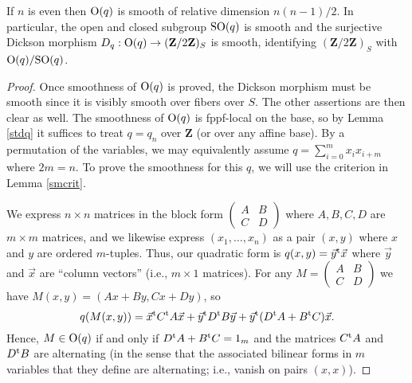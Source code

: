 \documentclass[10pt]{article}
\renewcommand{\(}{\left(}
\renewcommand{\)}{\right)}
\numberwithin{thm}{subsection}
\begin{document}
\begin{prop}\label{evensmooth} If $n$ is even then ${\rm{O}}(q)$ is smooth
of relative dimension $n(n-1)/2$.
In particular, the open and closed subgroup ${\rm{SO}}(q)$ is smooth and 
the surjective Dickson morphism $D_q:{\rm{O}}(q) \rightarrow ({\mathbf{Z}}/2{\mathbf{Z}})_S$
is smooth, identifying $({\mathbf{Z}}/2{\mathbf{Z}})_S$ with ${\rm{O}}(q)/{\rm{SO}}(q)$. 
\end{prop}

\begin{proof}
Once smoothness of ${\rm{O}}(q)$ is proved, the Dickson morphism
must be smooth since it is visibly smooth over fibers over $S$.
The other assertions are then clear as well.
The smoothness of ${\rm{O}}(q)$ is fppf-local on the base,
so by Lemma \ref{stdq} it suffices to treat $q = q_n$ over ${\mathbf{Z}}$ (or over any affine base).
By a permutation of the variables, we may equivalently assume
$q = \sum_{i=0}^m x_i x_{i+m}$ where $2m = n$.
To prove the smoothness for this $q$, we will use the criterion in Lemma \ref{smcrit}.

We express $n \times n$ matrices in the block form
$(\begin{smallmatrix} A & B \\ C & D \end{smallmatrix})$
where $A, B, C, D$ are $m \times m$ matrices, and we likewise
express $(x_1,\dots,x_n)$ as a pair $(x,y)$ where $x$ and $y$ are ordered $m$-tuples.
Thus, our quadratic form is $q(x,y) = \vec{y}^{\rm{t}}\vec{x}$
where $\vec{y}$ and $\vec{x}$ are ``column vectors'' (i.e., $m \times 1$ matrices).
For any $M = (\begin{smallmatrix} A & B \\ C & D \end{smallmatrix})$
we have $M(x,y) = (Ax + By, Cx + Dy)$, so 
$$q(M(x,y)) = \vec{x}^{\rm{t}}C^{\rm{t}}A\vec{x} + \vec{y}^{\rm{t}} D^{\rm{t}}B \vec{y} +
\vec{y}^{\rm{t}}(D^{\rm{t}}A + B^{\rm{t}}C) \vec{x}.$$
Hence,  $M \in {\rm{O}}(q)$ if and only if 
$D^{\rm{t}}A + B^{\rm{t}}C = 1_m$ and the matrices
$C^{\rm{t}}A$ and $D^{\rm{t}}B$ are alternating (in the sense
that the associated bilinear forms in $m$ variables that they define
are alternating; i.e., vanish on pairs $(x,x)$).  


\end{proof}
\end{document}
